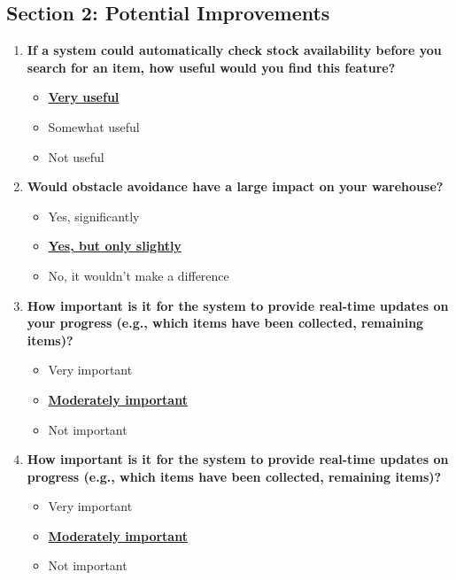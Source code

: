 \subsection*{Section 2: Potential Improvements}

\begin{enumerate}
    \item \textbf{If a system could automatically check stock availability before you search for an item, how useful would you find this feature?}
    \begin{itemize}
        \item \textbf{\underline{Very useful}}
        \item Somewhat useful
        \item Not useful
    \end{itemize}

    \item \textbf{Would obstacle avoidance have a large impact on your warehouse?}
    \begin{itemize}
        \item Yes, significantly
        \item \textbf{\underline{Yes, but only slightly}}
        \item No, it wouldn’t make a difference
    \end{itemize}

    \item \textbf{How important is it for the system to provide real-time updates on your progress (e.g., which items have been collected, remaining items)?}
    \begin{itemize}
        \item Very important
        \item \textbf{\underline{Moderately important}}
        \item Not important
    \end{itemize}

    \item \textbf{How important is it for the system to provide real-time updates on progress (e.g., which items have been collected, remaining items)?}
    \begin{itemize}
        \item Very important
        \item \textbf{\underline{Moderately important}}
        \item Not important
    \end{itemize}

\end{enumerate}

